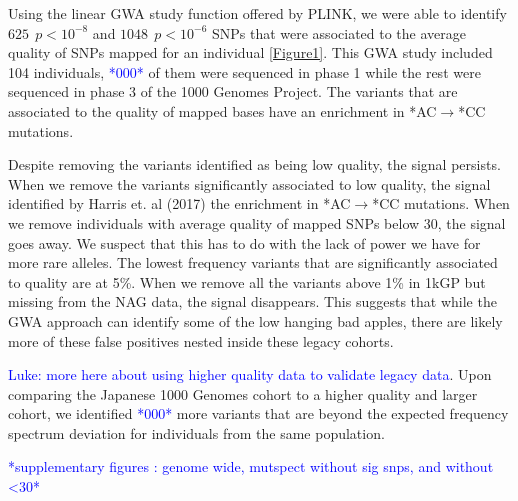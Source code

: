 \documentclass[9pt,lineno]{elife}
\newcommand{\luke}[1]{\textcolor{blue}{Luke: #1}}
\newcommand{\todo}[1]{\textcolor{blue}{*#1*}}
\begin{document}
Using the linear GWA study function offered by PLINK, we were able to identify $625\ \  p < 10^{-8}$ and $1048\ \ p < 10^{-6}$ SNPs that were associated to the average quality of SNPs mapped for an individual \ref{Figure1}.  This GWA study included 104 individuals, \todo{000} of them were sequenced in phase 1 while the rest were sequenced in phase 3 of the 1000 Genomes Project.
The variants that are associated to the quality of mapped bases have an enrichment in *AC${\rightarrow}$*CC mutations. 

Despite removing the variants identified as being low quality, the signal persists. 
When we remove the variants significantly associated to low quality, the signal identified by Harris et. al (2017) the enrichment in *AC${\rightarrow}$*CC mutations. 
When we remove individuals with average quality of mapped SNPs below 30, the signal goes away. 
We suspect that this has to do with the lack of power we have for more rare alleles. 
The lowest frequency variants that are significantly associated to quality are at 5\%. 
When we remove all the variants above 1\% in 1kGP but missing from the NAG data, the signal disappears.
This suggests that while the GWA approach can identify some of the low hanging bad apples, there are likely more of these false positives nested inside these legacy cohorts. 

 \luke{more here about using higher quality data to validate legacy data}. Upon comparing the Japanese 1000 Genomes cohort to a higher quality and larger cohort, we identified \todo{000} more variants that are beyond the expected frequency spectrum deviation for individuals from the same population.
 
\todo{supplementary figures : genome wide, mutspect without sig snps, and without <30}
\end{document}
